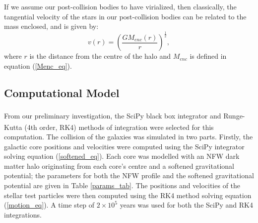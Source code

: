 \documentclass[10pt, twocolumn]{revtex4}    %
\begin{document}
If we assume our post-collision bodies to have virialized, then classically, the tangential velocity of the stars in our post-collision bodies can be related to the mass enclosed, and is given by:
\begin{equation}
v(r) = \left(\frac{GM_{enc}(r)}{r}\right)^{\frac{1}{2}},
\end{equation}
where $r$ is the distance from the centre of the halo and $M_{enc}$ is defined in equation (\ref{Menc_eq}).

\subsection*{Computational Model}

From our preliminary investigation, the SciPy black box integrator\textsuperscript{\cite{scipyintegrateode}} and Runge-Kutta (4th order, RK4)\textsuperscript{\cite{ButcherNumericalmethodsordinary2008}} methods of integration were selected for this computation. The collision of the galaxies was simulated in two parts. Firstly, the galactic core positions and velocities were computed using the SciPy integrator solving equation (\ref{softened_eq}). Each core was modelled with an NFW dark matter halo originating from each core's centre and a softened gravitational potential; the parameters for both the NFW profile and the softened gravitational potential are given in Table \ref{params_tab}. The positions and velocities of the stellar test particles were then computed using the RK4 method solving equation (\ref{motion_eq}). A time step of $2 \times 10^5$ years was used for both the SciPy and RK4 integrations.
\end{document}
